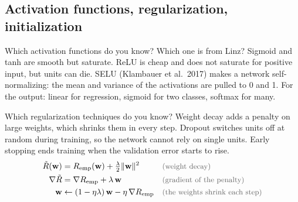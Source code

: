 \subsection{Activation functions, regularization, initialization}

\begin{qabox}{Which activation functions do you know? Which one is from Linz?}
\explain Sigmoid and tanh are smooth but saturate. ReLU is cheap and does not saturate for positive
input, but units can die. SELU (Klambauer et al.\ 2017) makes a network self-normalizing: the mean
and variance of the activations are pulled to 0 and 1. For the output: linear for regression,
sigmoid for two classes, softmax for many.
\end{qabox}

\begin{qabox}{Which regularization techniques do you know?}
\explain Weight decay adds a penalty on large weights, which shrinks them in every step. Dropout
switches units off at random during training, so the network cannot rely on single units. Early
stopping ends training when the validation error starts to rise.
\derive
\begin{align*}
\tilde{R}(\mathbf{w}) &= \Remp(\mathbf{w}) + \tfrac{\lambda}{2}\lVert\mathbf{w}\rVert^2 \why{weight decay} \\
\nabla\tilde{R} &= \nabla\Remp + \lambda\,\mathbf{w} \why{gradient of the penalty} \\
\mathbf{w} &\leftarrow (1 - \eta\lambda)\,\mathbf{w} - \eta\,\nabla\Remp \why{the weights shrink each step}
\end{align*}
\end{qabox}

